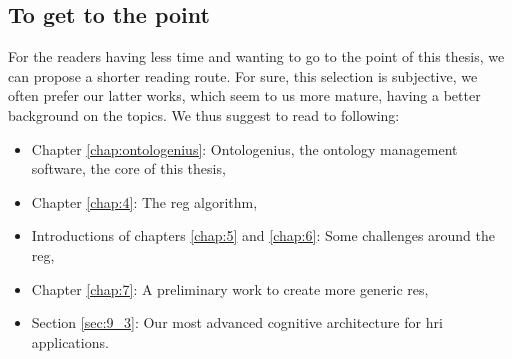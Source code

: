 \subsection*{To get to the point}

For the readers having less time and wanting to go to the point of this thesis, we can propose a shorter reading route. For sure, this selection is subjective, we often prefer our latter works, which seem to us more mature, having a better background on the topics. We thus suggest to read to following:

\begin{itemize}
  \item Chapter \ref{chap:ontologenius}: Ontologenius, the ontology management software, the core of this thesis,
  \item Chapter \ref{chap:4}: The \acrlong{reg} algorithm,
  \item Introductions of chapters \ref{chap:5} and \ref{chap:6}: Some challenges around the \acrlong{reg},
  \item Chapter \ref{chap:7}: A preliminary work to create more generic \acrlong{re}s,
  \item Section \ref{sec:9_3}: Our most advanced cognitive architecture for \acrlong{hri} applications.
\end{itemize}